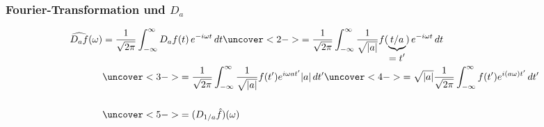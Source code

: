 %
%
\begin{frame}
\frametitle{Fourier-Transformation und $D_a$}
\begin{align*}
\widehat{D_af}(\omega)
&=
\frac{1}{\sqrt{2\pi}}
\int_{-\infty}^{\infty}
D_af(t)\,e^{-i\omega t}\,dt
\uncover<2->{=
\frac{1}{\sqrt{2\pi}}
\int_{-\infty}^{\infty}
\frac{1}{\sqrt{|a|}}
f(\underbrace{t/a}_{\displaystyle=t'})\,e^{-i\omega t}\,dt}
\\
&\uncover<3->{=
\frac{1}{\sqrt{2\pi}}
\int_{-\infty}^{\infty}
\frac{1}{\sqrt{|a|}}
f(t')e^{i\omega at'}
|a|\, dt'}
\uncover<4->{=
\sqrt{|a|}
\frac{1}{\sqrt{2\pi}}
\int_{-\infty}^{\infty}
f(t')e^{i(a\omega)t'}
\, dt'}
\\[14pt]
&\uncover<5->{=(D_{1/a}\hat{f})(\omega)}
\end{align*}
\end{frame}



